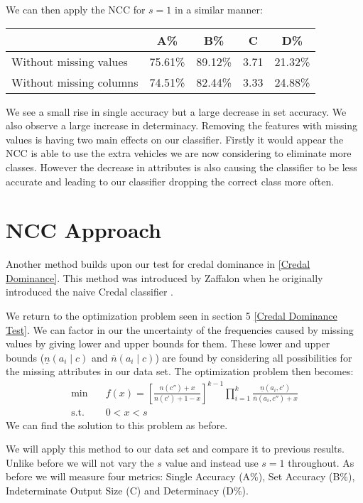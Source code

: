 We can then apply the NCC for $s=1$ in a similar manner:
\begin{center}
\begin{tabular}{l|c c c c}
	                        &   A\%   &   B\%   &  C   &   D\%   \\
	\hline
	Without missing values  & 75.61\% & 89.12\% & 3.71 & 21.32\% \\
	Without missing columns & 74.51\% & 82.44\% & 3.33 & 24.88\% \\
\end{tabular}
\end{center}

We see a small rise in single accuracy but a large decrease in set accuracy.
We also observe a large increase in determinacy.
Removing the features with missing values is having two main effects on our classifier.
Firstly it would appear the NCC is able to use the extra vehicles we are now considering to eliminate more classes.
However the decrease in attributes is also causing the classifier to be less accurate and leading to our classifier dropping the correct class more often.

\section{NCC Approach}

Another method builds upon our test for credal dominance in \cref{Credal Dominance}.
This method was introduced by Zaffalon when he originally introduced the naive Credal classifier \cite{Zaffalon01}.

We return to the optimization problem seen in section 5 \cref{Credal Dominance Test}.
We can factor in our the uncertainty of the frequencies caused by missing values by giving lower and upper bounds for them.
These lower and upper bounds ($\underline{n}(a_i \mid c)$ and $\overline{n}(a_i \mid c)$) are found by considering all possibilities for the missing attributes in our data set.
The optimization problem then becomes:
\begin{align}
	\min \quad & f(x) = \left[ \frac{n(c'') + x}{n(c') + 1 - x} \right]^{k-1} \prod_{i=1}^k \frac{\underline{n}(a_i, c')}{\overline{n}(a_i, c'') + x} \\
	\text{s.t.} \quad & 0 < x < s
\end{align}
We can find the solution to this problem as before.

We will apply this method to our data set and compare it to previous results.
Unlike before we will not vary the $s$ value and instead use $s=1$ throughout.
As before we will measure four metrics: Single Accuracy (A\%), Set Accuracy (B\%), Indeterminate Output Size (C) and Determinacy (D\%).

